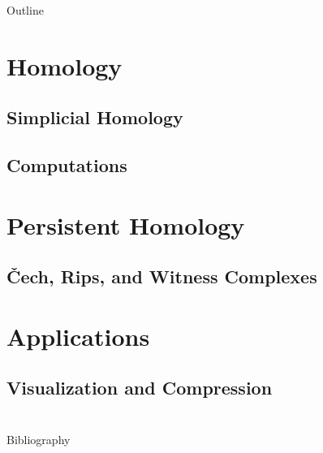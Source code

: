 






\begin{frame}
    \titlepage
\end{frame}

\begin{frame}{Outline}
	\tableofcontents
\end{frame}

\section[Homology]{Homology}
\subsection{Simplicial Homology}
\begin{frame}
\end{frame}
\subsection{Computations}
\begin{frame}
\end{frame}


\section[Persistence]{Persistent Homology}
\subsection{\v{C}ech, Rips, and Witness Complexes}
\begin{frame}
\end{frame}

\section{Applications}
\subsection{Visualization and Compression}
\begin{frame}
\end{frame}

\section{}
\begin{frame}{Bibliography}
	\nocite{wagner}
	\nocite{hatcher}
	\nocite{singh}
	
\end{frame}





